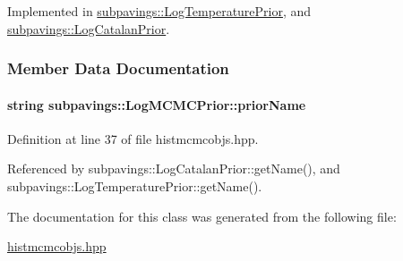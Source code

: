 \-Implemented in \hyperlink{classsubpavings_1_1LogTemperaturePrior_a09b2afaea3be6e703e24ecce36ef0b9a}{subpavings\-::\-Log\-Temperature\-Prior}, and \hyperlink{classsubpavings_1_1LogCatalanPrior_a54670df4e881f6516d2e368bee8c2439}{subpavings\-::\-Log\-Catalan\-Prior}.



\subsubsection{\-Member \-Data \-Documentation}
\hypertarget{classsubpavings_1_1LogMCMCPrior_a56c878a215bc9b7fb54871a3c0f6dc44}{
\paragraph[{prior\-Name}]{\setlength{\rightskip}{0pt plus 5cm}string {\bf subpavings\-::\-Log\-M\-C\-M\-C\-Prior\-::prior\-Name}}}\label{classsubpavings_1_1LogMCMCPrior_a56c878a215bc9b7fb54871a3c0f6dc44}


\-Definition at line 37 of file histmcmcobjs.\-hpp.



\-Referenced by subpavings\-::\-Log\-Catalan\-Prior\-::get\-Name(), and subpavings\-::\-Log\-Temperature\-Prior\-::get\-Name().



\-The documentation for this class was generated from the following file\-:\begin{DoxyCompactItemize}
\item 
\hyperlink{histmcmcobjs_8hpp}{histmcmcobjs.\-hpp}\end{DoxyCompactItemize}
